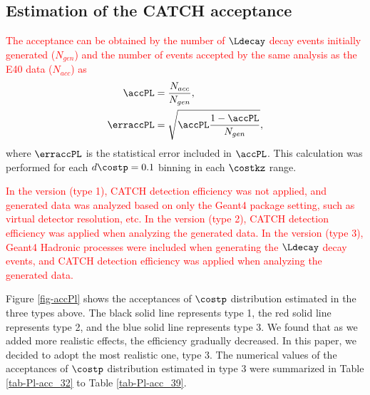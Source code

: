 

\subsection{Estimation of the CATCH acceptance}
\label{sec-Pl-esteff}

\textcolor{red}{ The acceptance can be obtained by the number of $\Ldecay$ decay events initially generated ($N_{gen}$) and the number of events accepted by the same analysis as the E40 data ($N_{acc}$) as }
\begin{align}
  \accPL &= \frac{N_{acc}}{N_{gen}}, \\
  \erraccPL &= \sqrt{\accPL \frac{1-\accPL}{N_{gen}}},
  \label{eq-accPL}
\end{align}
where $\erraccPL$ is the statistical error included in $\accPL$. This calculation was performed for each $d\costp=0.1$ binning in each $\costkz$ range.

\textcolor{red}{ In the  version (type 1), CATCH detection efficiency was not applied, and generated data was analyzed based on only the Geant4 package setting, such as virtual detector resolution, etc. In the  version (type 2), CATCH detection efficiency was applied when analyzing the generated data. In the  version (type 3), Geant4 Hadronic processes were included when generating the $\Ldecay$ decay events, and CATCH detection efficiency was applied when analyzing the generated data. }

Figure \ref{fig-accPl} shows the acceptances of $\costp$ distribution estimated in the three types above. The black solid line represents type 1, the red solid line represents type 2, and the blue solid line represents type 3. We found that as we added more realistic effects, the efficiency gradually decreased. In this paper, we decided to adopt the most realistic one, type 3. The numerical values of the acceptances of $\costp$ distribution estimated in type 3 were summarized in Table \ref{tab-Pl-acc_32} to Table \ref{tab-Pl-acc_39}.

